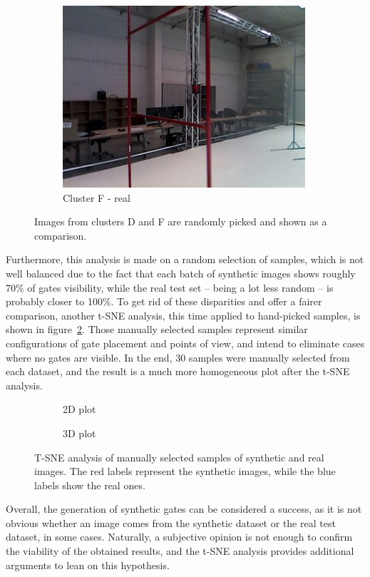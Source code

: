\begin{figure}[h!]
\begin{subfigure}{0.32\textwidth}
      \includegraphics[width=\textwidth]{figure/tsne_random/F/6.png}
      \caption{Cluster F - real}
   \end{subfigure}
   \caption[Synthetic versus real images comparison]{Images from clusters D and
   F are randomly picked and shown as a comparison.}
   \label{fig:clustering}
\end{figure}

Furthermore, this analysis is made on a random selection of samples, which is
not well balanced due to the fact that each batch of synthetic images shows
roughly 70\% of gates visibility, while the real test set -- being a lot less
random -- is probably closer to 100\%. To get rid of these disparities and
offer a fairer comparison, another t-SNE analysis, this time applied to
hand-picked samples, is shown in figure~\ref{fig:tsne-manual}. Those manually
selected samples represent similar configurations of gate placement and
points of view, and intend to eliminate cases where no gates are visible. In
the end, 30 samples were manually selected from each dataset, and the result is
a much more homogeneous plot after the t-SNE analysis.

\begin{figure}[h!]
	\centering
	\begin{subfigure}[h]{0.45\textwidth}
		\scalebox{0.4}{
			
		}
		\caption{2D plot}
	\end{subfigure}
	\begin{subfigure}[h]{0.45\textwidth}
		\scalebox{0.4}{
			
		}
		\caption{3D plot}
	\end{subfigure}
	\caption[T-SNE analysis of hand-picked samples.]{T-SNE analysis of
	manually selected samples of synthetic and real images. The red labels
	represent the synthetic images, while the blue labels show the real ones.}
	\label{fig:tsne-manual}
\end{figure}

Overall, the generation of synthetic gates can be considered a success, as
it is not obvious whether an image comes from the synthetic dataset or the real
test dataset, in some cases. Naturally, a subjective opinion is not enough to
confirm the viability of the obtained results, and the t-SNE analysis provides
additional arguments to lean on this hypothesis.
\clearpage
